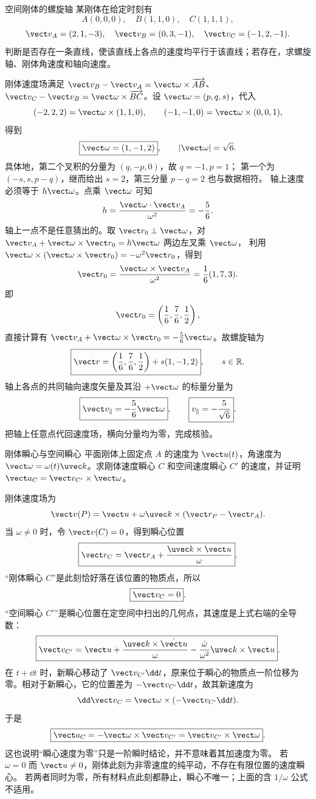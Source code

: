 \begin{practicebox}{空间刚体的螺旋轴}
某刚体在给定时刻有
\[
 A(0,0,0),\quad B(1,1,0),\quad C(1,1,1),
\]
\[
 \vect v_A=(2,1,-3),\quad \vect v_B=(0,3,-1),\quad
 \vect v_C=(-1,2,-1).
\]
判断是否存在一条直线，使该直线上各点的速度均平行于该直线；若存在，求螺旋轴、刚体角速度和轴向速度。
\label{r2ch01:pr:009}
\begin{solution}
刚体速度场满足
$\vect v_B-\vect v_A=\vect\omega\times\overrightarrow{AB}$、
$\vect v_C-\vect v_B=\vect\omega\times\overrightarrow{BC}$。设 $\vect\omega=(p,q,s)$，代入
\[
  (-2,2,2)=\vect\omega\times(1,1,0),\qquad
  (-1,-1,0)=\vect\omega\times(0,0,1),
\]
得到
\[
  \boxed{\vect\omega=(1,-1,2)},\qquad |\vect\omega|=\sqrt6.
\]
具体地，第二个叉积的分量为 $(q,-p,0)$，故 $q=-1,p=1$；
第一个为 $(-s,s,p-q)$，继而给出 $s=2$，第三分量 $p-q=2$ 也与数据相符。
轴上速度必须等于 $h\vect\omega$。点乘 $\vect\omega$ 可知
\[
  h=\frac{\vect\omega\cdot\vect v_A}{\omega^2}=-\frac56.
\]
轴上一点不是任意猜出的。取 $\vect r_0\perp\vect\omega$，对
$\vect v_A+\vect\omega\times\vect r_0=h\vect\omega$ 两边左叉乘 $\vect\omega$，
利用 $\vect\omega\times(\vect\omega\times\vect r_0)=-\omega^2\vect r_0$，得到
\[
 \vect r_0=\frac{\vect\omega\times\vect v_A}{\omega^2}
 =\frac16(1,7,3).
\]
即
\[
  \vect r_0=\left(\frac16,\frac76,\frac12\right),
\]
直接计算有
$\vect v_A+\vect\omega\times\vect r_0=-\tfrac56\vect\omega$。故螺旋轴为
\[
  \boxed{\vect r=\left(\frac16,\frac76,\frac12\right)
  +s(1,-1,2)},\qquad s\in\mathbb R.
\]
轴上各点的共同轴向速度矢量及其沿 $+\vect\omega$ 的标量分量为
\[
  \boxed{\vect v_\parallel=-\frac56\vect\omega},\qquad
  \boxed{v_\parallel=-\frac5{\sqrt6}}.
\]
把轴上任意点代回速度场，横向分量均为零，完成核验。
\end{solution}
\end{practicebox}

\begin{practicebox}{刚体瞬心与空间瞬心}
平面刚体上固定点 $A$ 的速度为 $\vect u(t)$，角速度为 $\vect\omega=\omega(t)\uvec k$。求刚体速度瞬心 $C$ 和空间速度瞬心 $C'$ 的速度，并证明
$\vect a_C=\vect v_{C'}\times\vect\omega$。
\label{r2ch01:pr:010}
\begin{solution}
刚体速度场为
\[
  \vect v(P)=\vect u+\omega\uvec k\times(\vect r_P-\vect r_A).
\]
当 $\omega\ne0$ 时，令 $\vect v(C)=0$，得到瞬心位置
\[
  \boxed{\vect r_C=\vect r_A+\frac{\uvec k\times\vect u}{\omega}}.
\]
“刚体瞬心 $C$”是此刻恰好落在该位置的物质点，所以
\[
  \boxed{\vect v_C=0}.
\]
“空间瞬心 $C'$”是瞬心位置在定空间中扫出的几何点，其速度是上式右端的全导数：
\[
  \boxed{\vect v_{C'}=\vect u
  +\frac{\uvec k\times\dot{\vect u}}{\omega}
  -\frac{\dot\omega}{\omega^2}\uvec k\times\vect u}.
\]
在 $t+\dd t$ 时，新瞬心移动了 $\vect v_{C'}\dd t$，原来位于瞬心的物质点一阶位移为零。相对于新瞬心，它的位置差为
$-\vect v_{C'}\dd t$，故其新速度为
\[
  \dd\vect v_C=\vect\omega\times(-\vect v_{C'}\dd t).
\]
于是
\[
  \boxed{\vect a_C=-\vect\omega\times\vect v_{C'}
  =\vect v_{C'}\times\vect\omega}.
\]
这也说明“瞬心速度为零”只是一阶瞬时结论，并不意味着其加速度为零。
若 $\omega=0$ 而 $\vect u\ne0$，刚体此刻为非零速度的纯平动，不存在有限位置的速度瞬心。
若两者同时为零，所有材料点此刻都静止，瞬心不唯一；上面的含 $1/\omega$ 公式不适用。
\end{solution}
\end{practicebox}


